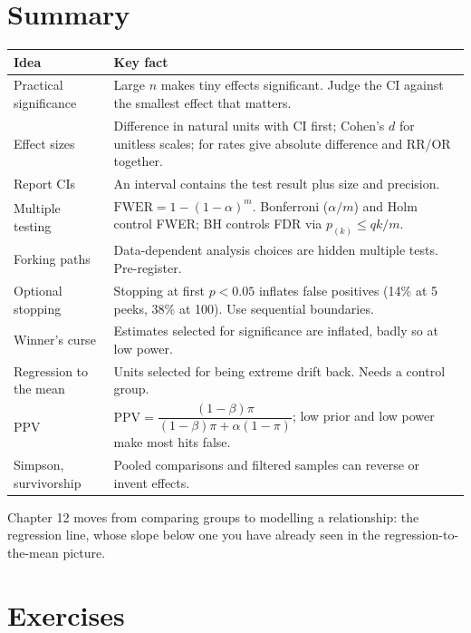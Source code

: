 \section{Summary}
\label{sec:pitfalls-summary}

\begin{center}
\renewcommand{\arraystretch}{1.3}
\begin{tabular}{p{3.4cm}p{9.0cm}}
\toprule
Idea & Key fact \\
\midrule
Practical significance & Large $n$ makes tiny effects significant. Judge the CI against the smallest effect that matters. \\
Effect sizes & Difference in natural units with CI first; Cohen's $d$ for unitless scales; for rates give absolute difference and RR/OR together. \\
Report CIs & An interval contains the test result plus size and precision. \\
Multiple testing & $\mathrm{FWER}=1-(1-\alpha)^m$. Bonferroni ($\alpha/m$) and Holm control FWER; BH controls FDR via $p_{(k)}\le qk/m$. \\
Forking paths & Data-dependent analysis choices are hidden multiple tests. Pre-register. \\
Optional stopping & Stopping at first $p<0.05$ inflates false positives (14\% at 5 peeks, 38\% at 100). Use sequential boundaries. \\
Winner's curse & Estimates selected for significance are inflated, badly so at low power. \\
Regression to the mean & Units selected for being extreme drift back. Needs a control group. \\
PPV & $\mathrm{PPV}=\dfrac{(1-\beta)\pi}{(1-\beta)\pi+\alpha(1-\pi)}$; low prior and low power make most hits false. \\
Simpson, survivorship & Pooled comparisons and filtered samples can reverse or invent effects. \\
\bottomrule
\end{tabular}
\end{center}

Chapter 12 moves from comparing groups to modelling a relationship: the regression
line, whose slope below one you have already seen in the regression-to-the-mean
picture.

\section{Exercises}
\label{sec:pitfalls-exercises}

